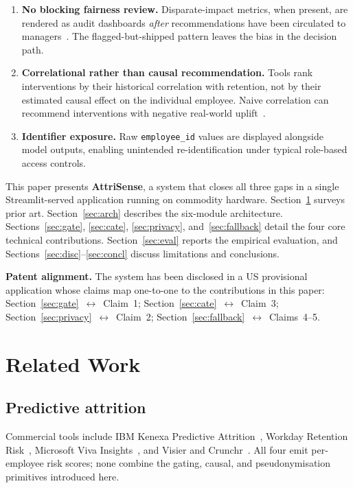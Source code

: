\documentclass[conference]{IEEEtran}
\begin{document}
\begin{enumerate}
\item \textbf{No blocking fairness review.} Disparate-impact metrics, when
present, are rendered as audit dashboards \emph{after} recommendations have
been circulated to managers~\cite{barocas2019fairness,fairlearn2018}. The
flagged-but-shipped pattern leaves the bias in the decision path.
\item \textbf{Correlational rather than causal recommendation.} Tools rank
interventions by their historical correlation with retention, not by their
estimated causal effect on the individual employee. Naive correlation can
recommend interventions with negative real-world uplift~\cite{athey2019cate}.
\item \textbf{Identifier exposure.} Raw \texttt{employee\_id} values are
displayed alongside model outputs, enabling unintended re-identification under
typical role-based access controls.
\end{enumerate}

This paper presents \textbf{AttriSense}, a system that closes all three gaps
in a single Streamlit-served application running on commodity hardware.
Section~\ref{sec:related} surveys prior art. Section~\ref{sec:arch} describes
the six-module architecture. Sections~\ref{sec:gate}, \ref{sec:cate},
\ref{sec:privacy}, and~\ref{sec:fallback} detail the four core technical
contributions. Section~\ref{sec:eval} reports the empirical evaluation, and
Sections~\ref{sec:disc}--\ref{sec:concl} discuss limitations and conclusions.

\textbf{Patent alignment.} The system has been disclosed in a US provisional
application whose claims map one-to-one to the contributions in this paper:
Section~\ref{sec:gate}~$\leftrightarrow$~Claim~1; Section~\ref{sec:cate}~$\leftrightarrow$~Claim~3;
Section~\ref{sec:privacy}~$\leftrightarrow$~Claim~2; Section~\ref{sec:fallback}~$\leftrightarrow$~Claims~4--5.

\section{Related Work}
\label{sec:related}

\subsection{Predictive attrition}
Commercial tools include IBM Kenexa Predictive Attrition~\cite{ibm2018kenexa},
Workday Retention Risk~\cite{workday2022retention}, Microsoft Viva
Insights~\cite{microsoft2023viva}, and Visier and
Crunchr~\cite{visier2024,crunchr2024}. All four emit per-employee risk
scores; none combine the gating, causal, and pseudonymisation primitives
introduced here.
\end{document}
